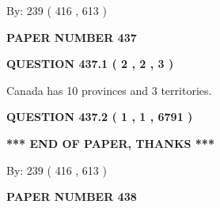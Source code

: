 \documentclass[12pt]{article}
\begin{document}
   
\hspace{1.0in} By: 
 239 ( 416 ,  613 )
   
   
   
   
\newpage 
\setcounter{page}{ 
   437001 } 
   
   
   
   
 {\textbf{ \Large{ PAPER NUMBER  437  }}}
   
   
\vspace{0.2in}
   
   
   
   
   
   
 \vspace{0.2in}
 
 
 
 
   
   
  
\vspace{0.2in}
  
{\textbf{\Large{QUESTION
437.1 
 ( 2 , 2 , 3 )
}}}
  
  
 
 
\noindent{}
 
 
Canada has 10  provinces and 3 territories.
 
 
 
 
  
\vspace{0.2in}
  
{\textbf{\Large{QUESTION
437.2 
 ( 1 , 1 , 6791 )
}}}
  
  
   
   
 \vspace{0.2in}
 
   
   
   
   
\vspace{1.0in} 
{\textbf{\large{ *** END OF PAPER, THANKS *** }}} 
   
   
\hspace{1.0in} By: 
 239 ( 416 ,  613 )
   
   
   
   
\newpage 
\setcounter{page}{ 
   438001 } 
   
   
   
   
 {\textbf{ \Large{ PAPER NUMBER  438  }}}
   
\end{document}
